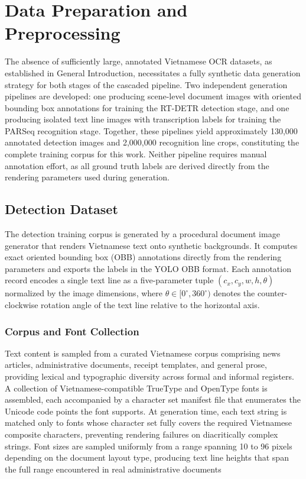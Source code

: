 \section{Data Preparation and Preprocessing}
\label{sec:data_preparation_and_preprocessing}
The absence of sufficiently large, annotated Vietnamese OCR datasets, as established in General Introduction, necessitates a fully synthetic data generation strategy for both stages of the cascaded pipeline. Two independent generation pipelines are developed: one producing scene-level document images with oriented bounding box annotations for training the RT-DETR detection stage, and one producing isolated text line images with transcription labels for training the PARSeq recognition stage. Together, these pipelines yield approximately 130,000 annotated detection images and 2,000,000 recognition line crops, constituting the complete training corpus for this work. Neither pipeline requires manual annotation effort, as all ground truth labels are derived directly from the rendering parameters used during generation.

\subsection{Detection Dataset}
The detection training corpus is generated by a procedural document image generator that renders Vietnamese text onto synthetic backgrounds. It computes exact oriented bounding box (OBB) annotations directly from the rendering parameters and exports the labels in the YOLO OBB format. Each annotation record encodes a single text line as a five-parameter tuple $(c_x, c_y, w, h, \theta)$ normalized by the image dimensions, where $\theta \in [0^\circ, 360^\circ)$ denotes the counter-clockwise rotation angle of the text line relative to the horizontal axis.

\subsubsection{Corpus and Font Collection}
Text content is sampled from a curated Vietnamese corpus comprising news articles, administrative documents, receipt templates, and general prose, providing lexical and typographic diversity across formal and informal registers. A collection of Vietnamese-compatible TrueType and OpenType fonts is assembled, each accompanied by a character set manifest file that enumerates the Unicode code points the font supports. At generation time, each text string is matched only to fonts whose character set fully covers the required Vietnamese composite characters, preventing rendering failures on diacritically complex strings. Font sizes are sampled uniformly from a range spanning 10 to 96 pixels depending on the document layout type, producing text line heights that span the full range encountered in real administrative documents

